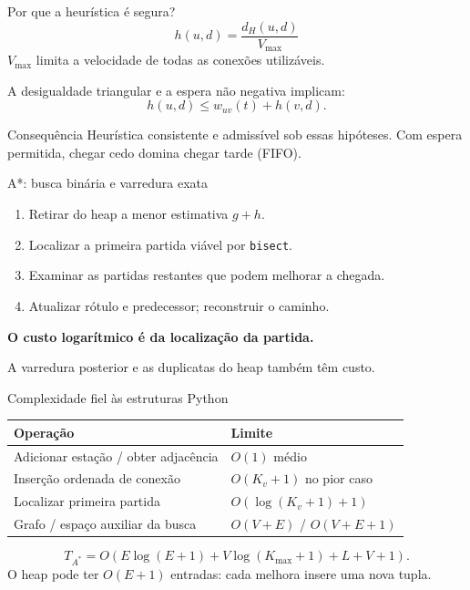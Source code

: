 \documentclass[aspectratio=169,11pt]{beamer}
\begin{document}
\begin{frame}{Por que a heurística é segura?}
\[h(u,d)=\frac{d_H(u,d)}{V_{\max}}\]
$V_{\max}$ limita a velocidade de todas as conexões utilizáveis.\par\medskip
A desigualdade triangular e a espera não negativa implicam:
\[h(u,d)\leq w_{uv}(t)+h(v,d).\]
\begin{block}{Consequência}
Heurística consistente e admissível sob essas hipóteses. Com espera permitida, chegar cedo domina chegar tarde (FIFO).
\end{block}
\end{frame}
\begin{frame}{A*: busca binária e varredura exata}
\begin{enumerate}
\item Retirar do heap a menor estimativa $g+h$.
\item Localizar a primeira partida viável por \texttt{bisect}.
\item Examinar as partidas restantes que podem melhorar a chegada.
\item Atualizar rótulo e predecessor; reconstruir o caminho.
\end{enumerate}
\medskip
\textbf{O custo logarítmico é da localização da partida.}\par
A varredura posterior e as duplicatas do heap também têm custo.
\end{frame}
\begin{frame}{Complexidade fiel às estruturas Python}
\begin{tabularx}{\textwidth}{@{}XX@{}}
\toprule Operação & Limite \\
\midrule
Adicionar estação / obter adjacência & $O(1)$ médio \\
Inserção ordenada de conexão & $O(K_v+1)$ no pior caso \\
Localizar primeira partida & $O(\log(K_v+1)+1)$ \\
Grafo / espaço auxiliar da busca & $O(V+E)$ / $O(V+E+1)$ \\
\bottomrule
\end{tabularx}
\medskip
{\small\[T_{A^*}=O(E\log(E+1)+V\log(K_{\max}+1)+L+V+1).\]}
O heap pode ter $O(E+1)$ entradas: cada melhora insere uma nova tupla.
\end{frame}
\end{document}
